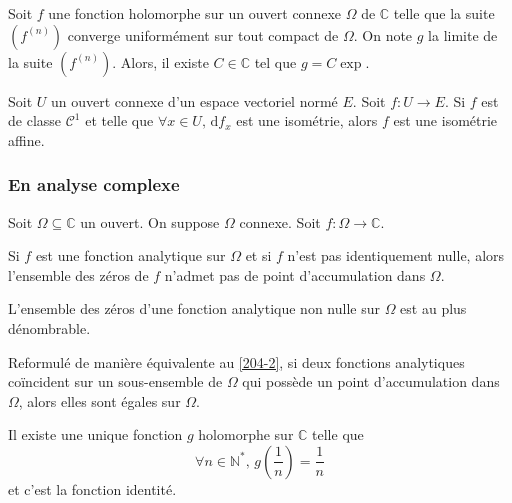   \begin{example}
    Soit $f$ une fonction holomorphe sur un ouvert connexe $\Omega$ de $\mathbb{C}$ telle que la suite $(f^{(n)})$ converge uniformément sur tout compact de $\Omega$. On note $g$ la limite de la suite $(f^{(n)})$. Alors, il existe $C \in \mathbb{C}$ tel que $g = C\exp$.
  \end{example}


  \begin{proposition}
    Soit $U$ un ouvert connexe d'un espace vectoriel normé $E$. Soit $f : U \rightarrow E$. Si $f$ est de classe $\mathcal{C}^1$ et telle que $\forall x \in U, \, \mathrm{d}f_x$ est une isométrie, alors $f$ est une isométrie affine.
  \end{proposition}

  \subsubsection{En analyse complexe}


  Soit $\Omega \subseteq \mathbb{C}$ un ouvert. On suppose $\Omega$ connexe. Soit $f : \Omega \rightarrow \mathbb{C}$.

  \begin{theorem}
    \label{204-2}
    Si $f$ est une fonction analytique sur $\Omega$ et si $f$ n'est pas identiquement nulle, alors l'ensemble des zéros de $f$ n'admet pas de point d'accumulation dans $\Omega$.
  \end{theorem}

  \begin{corollary}
    L'ensemble des zéros d'une fonction analytique non nulle sur $\Omega$ est au plus dénombrable.
  \end{corollary}

  \begin{remark}
    Reformulé de manière équivalente au \cref{204-2}, si deux fonctions analytiques coïncident sur un sous-ensemble de $\Omega$ qui possède un point d'accumulation dans $\Omega$, alors elles sont égales sur $\Omega$.
  \end{remark}


  \begin{example}
    Il existe une unique fonction $g$ holomorphe sur $\mathbb{C}$ telle que
    \[ \forall n \in \mathbb{N}^*, \, g\left( \frac{1}{n} \right) = \frac{1}{n} \]
    et c'est la fonction identité.
  \end{example}

